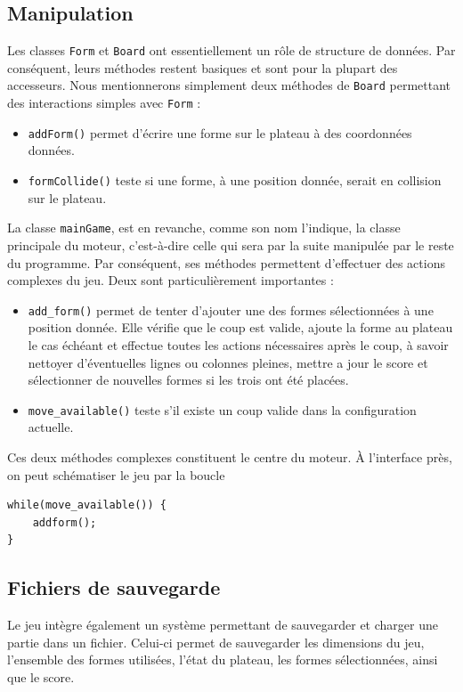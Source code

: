 \documentclass[11pt,a4paper]{article}
\begin{document}
\subsection{Manipulation}
Les classes \verb"Form" et \verb"Board" ont essentiellement un rôle de structure de données. Par conséquent, leurs méthodes restent basiques et sont pour la plupart des accesseurs. Nous mentionnerons simplement deux méthodes de \verb"Board" permettant des interactions simples avec \verb"Form" : 
\begin{itemize}
\item \verb"addForm()" permet d'écrire une forme sur le plateau à des coordonnées données.
\item \verb"formCollide()" teste si une forme, à une position donnée, serait en collision sur le plateau.
\end{itemize}

\medskip
La classe \verb"mainGame", est en revanche, comme son nom l'indique, la classe principale du moteur, c'est-à-dire celle qui sera par la suite manipulée par le reste du programme. Par conséquent, ses méthodes permettent d'effectuer des actions complexes du jeu. Deux sont particulièrement importantes :
\begin{itemize}
\item \verb"add_form()" permet de tenter d'ajouter une des formes sélectionnées à une position donnée. Elle vérifie que le coup est valide, ajoute la forme au plateau le cas échéant et effectue toutes les actions nécessaires après le coup, à savoir nettoyer d'éventuelles lignes ou colonnes pleines, mettre a jour le score et sélectionner de nouvelles formes si les trois ont été placées.
\item \verb"move_available()" teste s'il existe un coup valide dans la configuration actuelle.
\end{itemize}

\medskip
Ces deux méthodes complexes constituent le centre du moteur. À l'interface près, on peut schématiser le jeu par la boucle
\begin{verbatim}
while(move_available()) {
    addform();
}
\end{verbatim}



\subsection{Fichiers de sauvegarde}
Le jeu intègre également un système permettant de sauvegarder et charger une partie dans un fichier. Celui-ci permet de sauvegarder les dimensions du jeu, l'ensemble des formes utilisées, l'état du plateau, les formes sélectionnées, ainsi que le score.
\end{document}
